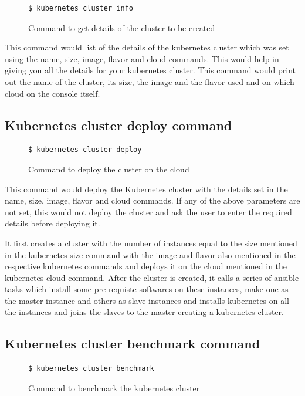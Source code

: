 \documentclass[9pt,twocolumn,twoside]{../../styles/osajnl}
\begin{document}
\begin{figure}[H]
\begin{verbatim}
$ kubernetes cluster info
\end{verbatim}
\caption{Command to get details of the cluster to be created}
\vspace{-4mm}
\label{Command to getthe details of the cluster to be created}
\end{figure}

This command would list of the details of the kubernetes cluster which
was set using the name, size, image, flavor and cloud commands. This
would help in giving you all the details for your kubernetes
cluster. This command would print out the name of the cluster, its
size, the image and the flavor used and on which cloud on the console
itself.

\subsection{Kubernetes cluster deploy command}
\begin{figure}[H]
\begin{verbatim}
$ kubernetes cluster deploy
\end{verbatim}
\caption{Command to deploy the cluster on the cloud}
\vspace{-4mm}
\label{Command to deploy the cluster on the cloud}
\end{figure}

This command would deploy the Kubernetes cluster with the details set
in the name, size, image, flavor and cloud commands. If any of the
above parameters are not set, this would not deploy the cluster and
ask the user to enter the required details before deploying it.

It first creates a cluster with the number of instances equal to the
size mentioned in the kubernetes size command with the image and
flavor also mentioned in the respective kubernetes commands and
deploys it on the cloud mentioned in the kubernetes cloud command.
After the cluster is created, it calls a series of ansible tasks which
install some pre requiste softwares on these instances, make one as
the master instance and others as slave instances and installs
kubernetes on all the instances and joins the slaves to the master
creating a kubernetes cluster.

\subsection{Kubernetes cluster benchmark command}
\begin{figure}[H]
\begin{verbatim}
$ kubernetes cluster benchmark
\end{verbatim}
\caption{Command to benchmark the kubernetes cluster}
\vspace{-4mm}
\label{Command to benchmark the kubernetes cluster}
\end{figure}
\end{document}

